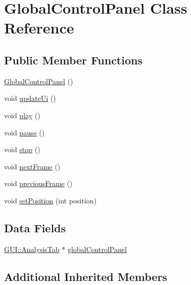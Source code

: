 \hypertarget{classGUI_1_1GlobalControlPanel}{}\section{Global\+Control\+Panel Class Reference}
\label{classGUI_1_1GlobalControlPanel}
\subsection*{Public Member Functions}
\begin{DoxyCompactItemize}
\item 
\hyperlink{classGUI_1_1GlobalControlPanel_ac00e18718e628cd9f3dc83bdf8fd9fb9}{Global\+Control\+Panel} ()
\item 
void \hyperlink{classGUI_1_1GlobalControlPanel_ae13c7f95f1ceda0fec18d18c3d7619f6}{update\+Ui} ()
\item 
void \hyperlink{classGUI_1_1GlobalControlPanel_a6d58098c6cf63c241ed03bc797256bb1}{play} ()
\item 
void \hyperlink{classGUI_1_1GlobalControlPanel_a7167f5c196fc5e167bfabde1a730e81d}{pause} ()
\item 
void \hyperlink{classGUI_1_1GlobalControlPanel_a8c528baf37154d347366083f0f816846}{stop} ()
\item 
void \hyperlink{classGUI_1_1GlobalControlPanel_a365329da56f8b07f8c95027ba967bbc3}{next\+Frame} ()
\item 
void \hyperlink{classGUI_1_1GlobalControlPanel_a3c96ed37c70ebc0b32c527a04e1536d1}{previous\+Frame} ()
\item 
void \hyperlink{classGUI_1_1GlobalControlPanel_a1aa68f77243229daea38d59bc5145d35}{set\+Position} (int position)
\end{DoxyCompactItemize}
\subsection*{Data Fields}
\begin{DoxyCompactItemize}
\item 
\hyperlink{classGUI_1_1AnalysisTab}{G\+U\+I\+::\+Analysis\+Tab} $\ast$ \hyperlink{classGUI_1_1GlobalControlPanel_a360a35388d458c292758e61a66d77674}{global\+Control\+Panel}
\end{DoxyCompactItemize}
\subsection*{Additional Inherited Members}


